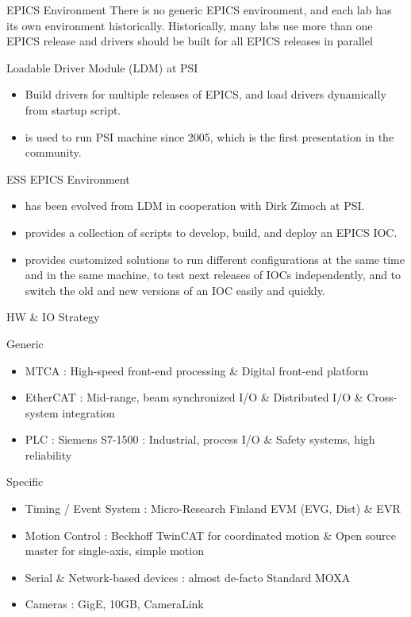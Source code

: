 \documentclass[
  9pt
  , table
  , ignorenonframetext
]{beamer}
\begin{document}
\begin{frame}{EPICS Environment}
  There is no generic EPICS environment, and each lab has its own environment historically. Historically, many labs use more than one EPICS release and drivers should be built for all EPICS releases in parallel
  \begin{block}{Loadable Driver Module (LDM) at PSI}
    \begin{itemize}
    \item Build drivers for multiple releases of EPICS, and load drivers dynamically from startup script.
    \item is used to run PSI machine since 2005, which is the first presentation in the community.
    \end{itemize}
  \end{block}

  \begin{exampleblock}{ESS EPICS Environment}
    \begin{itemize}
    \item has been evolved from LDM in cooperation with Dirk Zimoch at PSI.
    \item provides a collection of scripts to develop, build, and deploy an EPICS IOC.
    \item provides customized solutions to run different configurations at the same time and in the same machine, to test next releases of IOCs independently, and to switch the old and new versions of an IOC easily and quickly.
    \end{itemize}
  \end{exampleblock}
\end{frame}

\begin{frame}{HW \& IO Strategy}
  \begin{block}{Generic}
    \begin{itemize}
    \item{MTCA :} High-speed front-end processing \& Digital front-end platform 
    \item{EtherCAT :} Mid-range, beam synchronized I/O \& Distributed I/O \& Cross-system integration
    \item{PLC :} Siemens S7-1500 : Industrial, process I/O \& Safety systems, high reliability
    \end{itemize}
  \end{block}
 \begin{exampleblock}{Specific}
    \begin{itemize}
    \item Timing / Event System : Micro-Research Finland EVM (EVG, Dist) \& EVR
    \item Motion Control : Beckhoff TwinCAT for coordinated motion \& Open source master for single-axis, simple motion
    \item Serial \& Network-based devices : almost de-facto Standard MOXA 
    \item Cameras : GigE, 10GB, CameraLink 
    \end{itemize}
  \end{exampleblock}
  
\end{frame}
\end{document}
